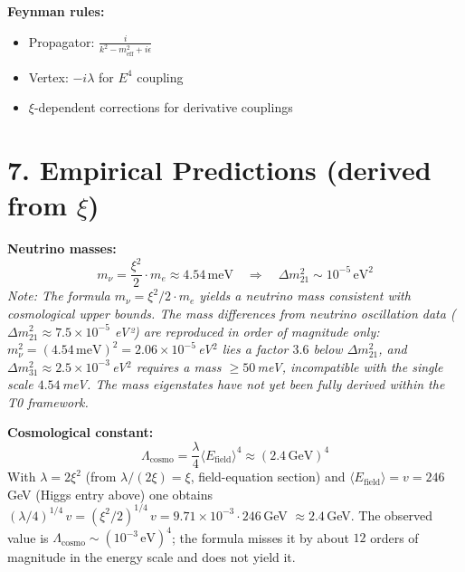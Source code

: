 	\textbf{Feynman rules:}
	\begin{itemize}
		\item Propagator: $\frac{i}{k^2 - m_{\text{eff}}^2 + i\epsilon}$
		\item Vertex: $-i\lambda$ for $E^4$ coupling
		\item $\xi$-dependent corrections for derivative couplings
	\end{itemize}
	
	\section*{7. Empirical Predictions (derived from $\xi$)}
	

	\textbf{Neutrino masses:}
	\[
	m_\nu = \frac{\xi^2}{2} \cdot m_e \approx 4.54 \, \text{meV} \quad \Rightarrow \quad \Delta m_{21}^2 \sim 10^{-5} \, \text{eV}^2
	\]
	\textit{Note: The formula $m_\nu = \xi^2/2 \cdot m_e$ yields a neutrino mass consistent with cosmological upper bounds. The mass differences from neutrino oscillation data ($\Delta m^2_{21} \approx 7.5 \times 10^{-5}$ eV²) are reproduced in order of magnitude only: $m_\nu^2 = (4.54\,\text{meV})^2 = 2.06\times10^{-5}$\,eV$^2$ lies a factor $3.6$ below $\Delta m^2_{21}$, and $\Delta m^2_{31} \approx 2.5\times10^{-3}$\,eV$^2$ requires a mass $\geq 50$\,meV, incompatible with the single scale $4.54$\,meV. The mass eigenstates have not yet been fully derived within the T0 framework.}
	
	\textbf{Cosmological constant:}
	\[
	\Lambda_{\text{cosmo}} = \frac{\lambda}{4} \langle E_{\text{field}} \rangle^4 \approx (2.4\,\text{GeV})^4
	\]
	With $\lambda = 2\xi^2$ (from $\lambda/(2\xi) = \xi$, field-equation section) and $\langle E_{\text{field}} \rangle = v = 246$\,GeV (Higgs entry above) one obtains $(\lambda/4)^{1/4}\,v = (\xi^2/2)^{1/4}\,v = 9.71\times10^{-3}\cdot 246$\,GeV $\approx 2.4$\,GeV. The observed value is $\Lambda_{\text{cosmo}} \sim (10^{-3}\,\text{eV})^4$; the formula misses it by about $12$ orders of magnitude in the energy scale and does not yield it.
	
